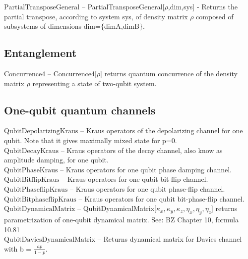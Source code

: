 \noindent\textbf{$ \text{PartialTransposeGeneral} $ }-- PartialTransposeGeneral[$\rho $,dim,sys] - Returns the partial transpose, according to system sys, of density matrix $\rho $ composed of subsystems of dimensions dim=$\{$dimA,dimB$\}$. $  $\\

\subsection{Entanglement}

\noindent\textbf{$ \text{Concurrence4} $ }-- Concurrence4[$\rho $] returns quantum concurrence of the density matrix $\rho $ representing a state of two-qubit system.$  $\\

\subsection{One-qubit quantum channels}

\noindent\textbf{$ \text{QubitDepolarizingKraus} $ }-- Kraus operators of the depolarizing channel for one qubit. Note that it gives maximally mixed state for p=0.$  $\\

\noindent\textbf{$ \text{QubitDecayKraus} $ }-- Kraus operators of the decay channel, also know as amplitude damping, for one qubit.$  $\\

\noindent\textbf{$ \text{QubitPhaseKraus} $ }-- Kraus operators for one qubit phase damping channel.$  $\\

\noindent\textbf{$ \text{QubitBitflipKraus} $ }-- Kraus operators for one qubit bit-flip channel.$  $\\

\noindent\textbf{$ \text{QubitPhaseflipKraus} $ }-- Kraus operators for one qubit phase-flip channel.$  $\\

\noindent\textbf{$ \text{QubitBitphaseflipKraus} $ }-- Kraus operators for one qubit bit-phase-flip channel.$  $\\

\noindent\textbf{$ \text{QubitDynamicalMatrix} $ }-- QubitDynamicalMatrix[$ \kappa _x,\kappa _y,\kappa _z,\eta _x,\eta _y,\eta _z $] returns parametrization of one-qubit dynamical matrix. See: BZ Chapter 10, formula 10.81$  $\\

\noindent\textbf{$ \text{QubitDaviesDynamicalMatrix} $ }-- Returns dynamical matrix for Davies channel with b = $ \frac{a p}{1-p}. $\\

